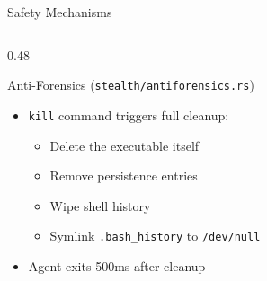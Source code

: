 \documentclass[aspectratio=169]{beamer}
\newcommand{\code}[1]{\texttt{\textcolor{primaryblue}{#1}}}
\begin{document}
\begin{frame}{Safety Mechanisms}
\begin{columns}[T]
\begin{column}{0.48\textwidth}
      \vspace{0.3em}
      \begin{block}{Anti-Forensics (\code{stealth/antiforensics.rs})}
        \footnotesize
        \begin{itemize}
          \item \code{kill} command triggers full cleanup:
          \begin{itemize}
            \item Delete the executable itself
            \item Remove persistence entries
            \item Wipe shell history
            \item Symlink \code{.bash\_history} to \code{/dev/null}
          \end{itemize}
          \item Agent exits 500ms after cleanup
        \end{itemize}
      \end{block}
    \end{column}
  \end{columns}
\end{frame}
\end{document}
